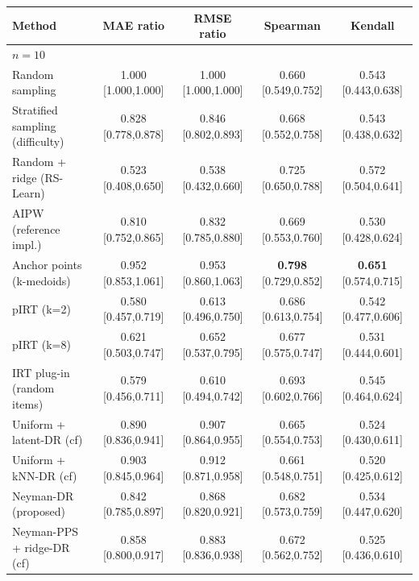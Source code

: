 \begin{tabular}{l cccc}
\toprule
Method & MAE ratio & RMSE ratio & Spearman & Kendall\\
\midrule
\multicolumn{5}{l}{\emph{$n=10$}}\\
Random sampling & 1.000 {\scriptsize[1.000,1.000]} & 1.000 {\scriptsize[1.000,1.000]} & 0.660 {\scriptsize[0.549,0.752]} & 0.543 {\scriptsize[0.443,0.638]} \\
Stratified sampling (difficulty) & 0.828 {\scriptsize[0.778,0.878]} & 0.846 {\scriptsize[0.802,0.893]} & 0.668 {\scriptsize[0.552,0.758]} & 0.543 {\scriptsize[0.438,0.632]} \\
Random + ridge (RS-Learn) & 0.523 {\scriptsize[0.408,0.650]} & 0.538 {\scriptsize[0.432,0.660]} & 0.725 {\scriptsize[0.650,0.788]} & 0.572 {\scriptsize[0.504,0.641]} \\
AIPW (reference impl.) & 0.810 {\scriptsize[0.752,0.865]} & 0.832 {\scriptsize[0.785,0.880]} & 0.669 {\scriptsize[0.553,0.760]} & 0.530 {\scriptsize[0.428,0.624]} \\
Anchor points (k-medoids) & 0.952 {\scriptsize[0.853,1.061]} & 0.953 {\scriptsize[0.860,1.063]} & \textbf{0.798} {\scriptsize[0.729,0.852]} & \textbf{0.651} {\scriptsize[0.574,0.715]} \\
pIRT (k=2) & 0.580 {\scriptsize[0.457,0.719]} & 0.613 {\scriptsize[0.496,0.750]} & 0.686 {\scriptsize[0.613,0.754]} & 0.542 {\scriptsize[0.477,0.606]} \\
pIRT (k=8) & 0.621 {\scriptsize[0.503,0.747]} & 0.652 {\scriptsize[0.537,0.795]} & 0.677 {\scriptsize[0.575,0.747]} & 0.531 {\scriptsize[0.444,0.601]} \\
IRT plug-in (random items) & 0.579 {\scriptsize[0.456,0.711]} & 0.610 {\scriptsize[0.494,0.742]} & 0.693 {\scriptsize[0.602,0.766]} & 0.545 {\scriptsize[0.464,0.624]} \\
Uniform + latent-DR (cf) & 0.890 {\scriptsize[0.836,0.941]} & 0.907 {\scriptsize[0.864,0.955]} & 0.665 {\scriptsize[0.554,0.753]} & 0.524 {\scriptsize[0.430,0.611]} \\
Uniform + kNN-DR (cf) & 0.903 {\scriptsize[0.845,0.964]} & 0.912 {\scriptsize[0.871,0.958]} & 0.661 {\scriptsize[0.548,0.751]} & 0.520 {\scriptsize[0.425,0.612]} \\
Neyman-DR (proposed) & 0.842 {\scriptsize[0.785,0.897]} & 0.868 {\scriptsize[0.820,0.921]} & 0.682 {\scriptsize[0.573,0.759]} & 0.534 {\scriptsize[0.447,0.620]} \\
Neyman-PPS + ridge-DR (cf) & 0.858 {\scriptsize[0.800,0.917]} & 0.883 {\scriptsize[0.836,0.938]} & 0.672 {\scriptsize[0.562,0.752]} & 0.525 {\scriptsize[0.436,0.610]} \\

\end{tabular}
